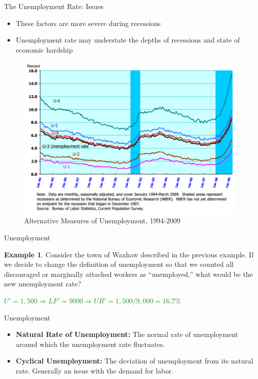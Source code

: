 \documentclass[xcolor={dvipsnames},pdf, hyperref={colorlinks=true, citecolor=ForestGreen, linkcolor=BlueViolet, urlcolor=Magenta}]{beamer}
\theoremstyle{definition}
\newtheorem{exmp}{Example}[section]
\newcommand{\defn}[1]{\textbf{#1}}
\newcommand{\ddp}[1]{{\textcolor{ForestGreen}{#1}}}
\begin{document}
\begin{frame}{The Unemployment Rate: Issues}
	\begin{itemize}
		\item These factors are more severe during recessions
		\item Unemployment rate may understate the depths of recessions and state of economic hardship 
	\end{itemize}
	\begin{figure}
		\centering
		\includegraphics[scale=.3]{01C_5.png}
		\caption{Alternative Measures of Unemployment, 1994-2009}
	\end{figure}
\end{frame}

\begin{frame}{Unemployment}
\begin{exmp}
	Consider the town of Waxhaw described in the previous example. 	If we decide to change the definition of unemployment so that we counted all discouraged or marginally attached workers as ``unemployed,'' what would be the new unemployment rate?
\end{exmp}
\ddp{\pause $U' = 1,500 \Rightarrow LF' = 9000 \Rightarrow UR' = 1,500/9,000 = 16.7\%$}
\end{frame}

\begin{frame}{Unemployment}
\begin{itemize}
	\item \defn{Natural Rate of Unemployment:} The normal rate of unemployment around which the unemployment rate fluctuates.
	
	\item \defn{Cyclical Unemployment:} The deviation of unemployment from its natural rate. Generally an issue with the demand for labor.
	
\end{itemize}
\end{frame}
\end{document}
